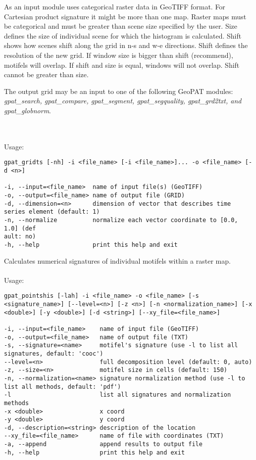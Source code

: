 As an input module uses categorical raster data in GeoTIFF format. For Cartesian product signature it might be more than one map. Raster maps must be categorical and must be greater than scene size specified by the user. Size defines the size of individual scene for which the histogram is calculated. Shift shows how scenes shift along the grid in n-s and w-e directions. Shift defines the resolution of the new grid. If window size is bigger than shift (recommend), motifels will overlap. If shift and size is equal, windows will not overlap. Shift cannot be greater than size. 

The output grid may be an input to one of the following GeoPAT modules: {\it gpat\_search, gpat\_compare, gpat\_segment, gpat\_segquality, gpat\_grd2txt, and gpat\_globnorm}.

{}
\\\\
Usage:

\begin{minipage}{\linewidth}
\begin{lstlisting}
gpat_gridts [-nh] -i <file_name> [-i <file_name>]... -o <file_name> [-d <n>]

-i, --input=<file_name>  name of input file(s) (GeoTIFF)
-o, --output=<file_name> name of output file (GRID)
-d, --dimension=<n>      dimension of vector that describes time series element (default: 1)
-n, --normalize          normalize each vector coordinate to [0.0, 1.0] (def
ault: no)
-h, --help               print this help and exit
\end{lstlisting}
\end{minipage}

Calculates numerical signatures of individual motifels within a raster map.
\\\\
Usage:

\begin{minipage}{\linewidth}
\begin{lstlisting}
gpat_pointshis [-lah] -i <file_name> -o <file_name> [-s <signature_name>] [--level=<n>] [-z <n>] [-n <normalization_name>] [-x <double>] [-y <double>] [-d <string>] [--xy_file=<file_name>]

-i, --input=<file_name>    name of input file (GeoTIFF)
-o, --output=<file_name>   name of output file (TXT)
-s, --signature=<name>     motifel's signature (use -l to list all signatures, default: 'cooc')
--level=<n>                full decomposition level (default: 0, auto)
-z, --size=<n>             motifel size in cells (default: 150)
-n, --normalization=<name> signature normalization method (use -l to list all methods, default: 'pdf')
-l                         list all signatures and normalization methods
-x <double>                x coord
-y <double>                y coord
-d, --description=<string> description of the location
--xy_file=<file_name>      name of file with coordinates (TXT)
-a, --append               append results to output file
-h, --help                 print this help and exit
\end{lstlisting}
\end{minipage}

